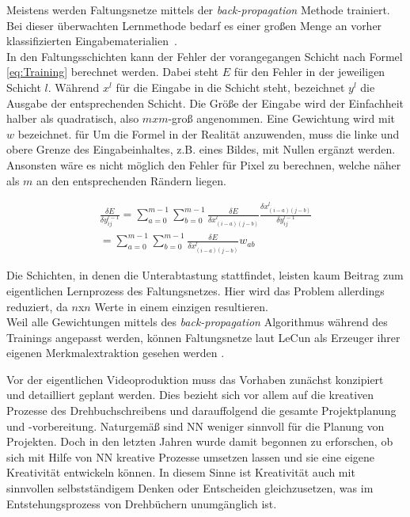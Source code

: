 \documentclass[times, 12pt,twocolumn]{article}
\begin{document}
 \label{sec:Training}
Meistens werden Faltungsnetze mittels der \textit{back-propagation} Methode trainiert. Bei dieser überwachten Lernmethode bedarf es einer großen Menge an vorher klassifizierten Eingabematerialien~\cite{5537907}. \\
In den Faltungsschichten kann der Fehler der vorangegangen Schicht nach Formel \ref{eq:Training} berechnet werden. Dabei steht $E$ für den Fehler in der jeweiligen Schicht $l$. Während $x^l$ für die Eingabe in die Schicht steht, bezeichnet $y^l$ die Ausgabe der entsprechenden Schicht. Die Größe der Eingabe wird der Einfachheit halber als quadratisch, also $mxm$-groß angenommen. Eine Gewichtung wird mit $w$ bezeichnet. für Um die Formel in der Realität anzuwenden, muss die linke und obere Grenze des Eingabeinhaltes, z.B. eines Bildes, mit Nullen ergänzt werden. Ansonsten wäre es nicht möglich den Fehler für Pixel zu berechnen, welche näher als $m$ an den entsprechenden Rändern liegen. 

\footnotesize
\begin{equation}
\begin{aligned}
\frac{\delta E}{\delta y_{ij}^{l-1}} = \sum_{a=0}^{m-1} \sum_{b=0}^{m-1} \frac{\delta E}{\delta x_{(i-a)(j-b)}^{l}} \frac{\delta x_{(i-a)(j-b)}^{l}}{\delta y_{ij}^{l-1}}  \\
= \sum \limits_{a=0}^{m-1} \sum \limits_{b=0}^{m-1} \frac{\delta E}{\delta x_{(i-a)(j-b)}^{l}} w_{ab}
\end{aligned}
	\label{eq:Training}
\end{equation}
\small

Die Schichten, in denen die Unterabtastung stattfindet, leisten kaum Beitrag zum eigentlichen Lernprozess des Faltungsnetzes. Hier wird das Problem allerdings reduziert, da $n$x$n$ Werte in einem einzigen resultieren. \\
Weil alle Gewichtungen mittels des \textit{back-propagation} Algorithmus während des Trainings angepasst werden, können Faltungsnetze laut LeCun als Erzeuger ihrer eigenen Merkmalextraktion gesehen werden \cite{LeCun:1998:CNI:303568.303704}.








 \label{sec:Konzeption}
Vor der eigentlichen Videoproduktion muss das Vorhaben zunächst konzipiert und detailliert geplant werden. Dies bezieht sich vor allem auf die kreativen Prozesse des Drehbuchschreibens und darauffolgend die gesamte Projektplanung und -vorbereitung. Naturgemäß sind NN weniger sinnvoll für die Planung von Projekten. Doch in den letzten Jahren wurde damit begonnen zu erforschen, ob sich mit Hilfe von NN kreative Prozesse umsetzen lassen und sie eine eigene Kreativität entwickeln können. In diesem Sinne ist Kreativität auch mit sinnvollen selbstständigem Denken oder Entscheiden gleichzusetzen, was  im Entstehungsprozess von Drehbüchern unumgänglich ist.
\end{document}
